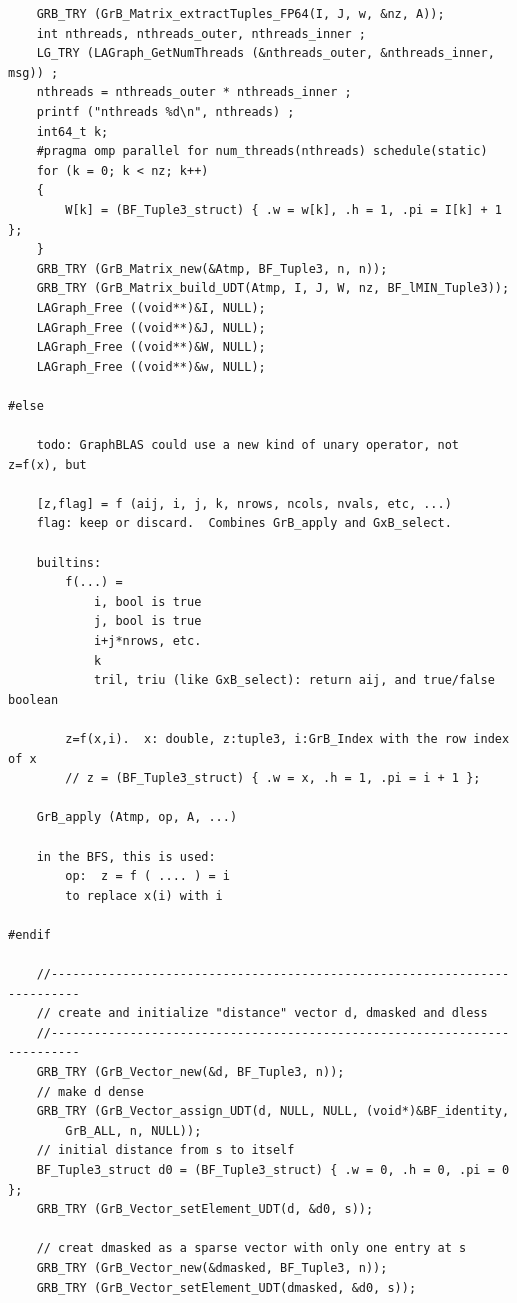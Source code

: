 \begin{verbatim}
    GRB_TRY (GrB_Matrix_extractTuples_FP64(I, J, w, &nz, A));
    int nthreads, nthreads_outer, nthreads_inner ;
    LG_TRY (LAGraph_GetNumThreads (&nthreads_outer, &nthreads_inner, msg)) ;
    nthreads = nthreads_outer * nthreads_inner ;
    printf ("nthreads %d\n", nthreads) ;
    int64_t k;
    #pragma omp parallel for num_threads(nthreads) schedule(static)
    for (k = 0; k < nz; k++)
    {
        W[k] = (BF_Tuple3_struct) { .w = w[k], .h = 1, .pi = I[k] + 1 };
    }
    GRB_TRY (GrB_Matrix_new(&Atmp, BF_Tuple3, n, n));
    GRB_TRY (GrB_Matrix_build_UDT(Atmp, I, J, W, nz, BF_lMIN_Tuple3));
    LAGraph_Free ((void**)&I, NULL);
    LAGraph_Free ((void**)&J, NULL);
    LAGraph_Free ((void**)&W, NULL);
    LAGraph_Free ((void**)&w, NULL);

#else

    todo: GraphBLAS could use a new kind of unary operator, not z=f(x), but

    [z,flag] = f (aij, i, j, k, nrows, ncols, nvals, etc, ...)
    flag: keep or discard.  Combines GrB_apply and GxB_select.

    builtins:
        f(...) =
            i, bool is true
            j, bool is true
            i+j*nrows, etc.
            k
            tril, triu (like GxB_select): return aij, and true/false boolean

        z=f(x,i).  x: double, z:tuple3, i:GrB_Index with the row index of x
        // z = (BF_Tuple3_struct) { .w = x, .h = 1, .pi = i + 1 };

    GrB_apply (Atmp, op, A, ...)

    in the BFS, this is used:
        op:  z = f ( .... ) = i
        to replace x(i) with i

#endif

    //--------------------------------------------------------------------------
    // create and initialize "distance" vector d, dmasked and dless
    //--------------------------------------------------------------------------
    GRB_TRY (GrB_Vector_new(&d, BF_Tuple3, n));
    // make d dense
    GRB_TRY (GrB_Vector_assign_UDT(d, NULL, NULL, (void*)&BF_identity,
        GrB_ALL, n, NULL));
    // initial distance from s to itself
    BF_Tuple3_struct d0 = (BF_Tuple3_struct) { .w = 0, .h = 0, .pi = 0 };
    GRB_TRY (GrB_Vector_setElement_UDT(d, &d0, s));

    // creat dmasked as a sparse vector with only one entry at s
    GRB_TRY (GrB_Vector_new(&dmasked, BF_Tuple3, n));
    GRB_TRY (GrB_Vector_setElement_UDT(dmasked, &d0, s));


\end{verbatim}
